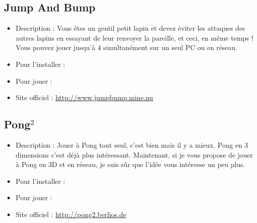 \subsection{Jump And Bump}
\begin{itemize}
\begingroup
{}
\item Description : Vous êtes un gentil petit lapin et devez éviter les attaques des autres lapins en essayant de leur renvoyer la pareille, et ceci, en même temps ! Vous pouvez jouer jusqu'à 4 simultanément sur un seul PC ou en réseau.{\par}
\endgroup
\item Pour l'installer : 
\item Pour jouer : 
\item Site officiel : \url{http://www.jumpbump.mine.nu}{\par}
\end{itemize}
\subsection{Pong$^2$}
\begin{itemize}
\begingroup
{}
\item Description : Jouer à Pong tout seul, c'est bien mais il y a mieux. Pong en 3 dimensions c'est déjà plus intéressant. Maintenant, si je vous propose de jouer à Pong en 3D et en réseau, je suis sûr que l'idée vous intéresse un peu plus.{\par}
\item Pour l'installer : 
\item Pour jouer : 
\item Site officiel : \url{http://pong2.berlios.de}{\par}
\endgroup
\end{itemize}

